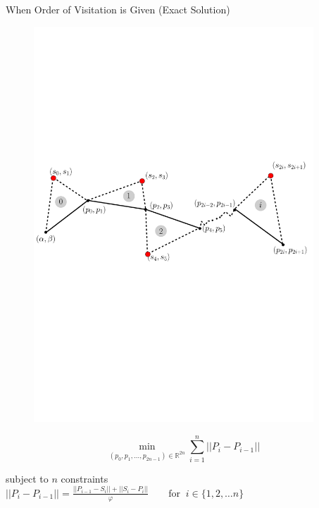 \documentclass{beamer}
\begin{document}
\begin{frame}{When Order of Visitation is Given (Exact Solution)}
  \vspace{-25pt}
  \begin{figure}[H]
    \centering
    \includegraphics[width=10.5cm]{../img/lpdescr.pdf}
  \end{figure}
  \vspace{-10pt}
  $$\displaystyle \min_{(p_0,p_1,\ldots,p_{2n-1}) \in \mathbb{R}^{2n}}  \sum_{i=1}^{n}  || P_i - P_{i-1} ||$$

\vspace{-7pt}
subject to \(n\) constraints \\

\hspace{40pt}$||P_{i}-P_{i-1}||=\frac{ || P_{i-1}-S_{i}|| + ||S_{i}-P_{i}||}{\varphi}\qquad \text{for} \;\; i \in \{1,2,\ldots n\}$
\end{frame}

\end{document}
